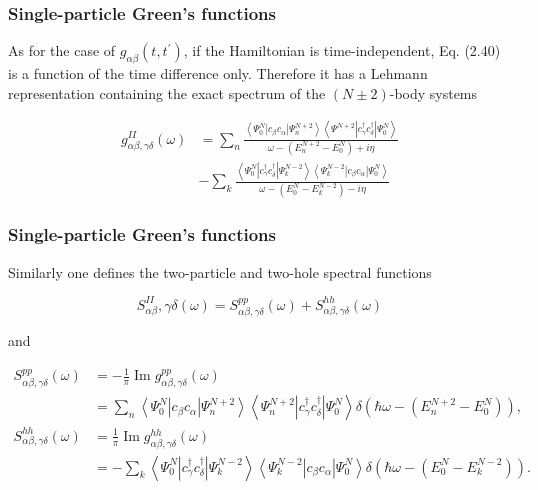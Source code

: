 \documentclass[compress]{beamer}
\begin{document}
\frame
{
\frametitle{Single-particle Green's functions}
\begin{small}
{\scriptsize
As for the case of $g_{\alpha \beta}\left(t, t^{\prime}\right)$, if
the Hamiltonian is time-independent, Eq. (2.40) is a function of the
time difference only. Therefore it has a Lehmann representation
containing the exact spectrum of the $(N \pm 2)$-body systems

$$
\begin{aligned}
g_{\alpha \beta, \gamma \delta}^{I I}(\omega) & =\sum_{n} \frac{\left\langle\Psi_{0}^{N}\left|c_{\beta} c_{\alpha}\right| \Psi_{n}^{N+2}\right\rangle\left\langle\Psi^{N+2}\left|c_{\gamma}^{\dagger} c_{\delta}^{\dagger}\right| \Psi_{0}^{N}\right\rangle}{\omega-\left(E_{n}^{N+2}-E_{0}^{N}\right)+i \eta} \\
& -\sum_{k} \frac{\left\langle\Psi_{0}^{N}\left|c_{\gamma}^{\dagger} c_{\delta}^{\dagger}\right| \Psi_{k}^{N-2}\right\rangle\left\langle\Psi_{k}^{N-2}\left|c_{\beta} c_{\alpha}\right| \Psi_{0}^{N}\right\rangle}{\omega-\left(E_{0}^{N}-E_{k}^{N-2}\right)-i \eta}
\end{aligned}
$$

}
\end{small}
}
\frame
{
\frametitle{Single-particle Green's functions}
\begin{small}
{\scriptsize
Similarly one defines the two-particle and two-hole spectral functions

$$
S_{\alpha \beta}^{I I}, \gamma \delta(\omega)=S_{\alpha \beta, \gamma \delta}^{p p}(\omega)+S_{\alpha \beta, \gamma \delta}^{h h}(\omega)
$$

and

$$
\begin{aligned}
S_{\alpha \beta, \gamma \delta}^{p p}(\omega) & =-\frac{1}{\pi} \operatorname{Im} g_{\alpha \beta, \gamma \delta}^{p p}(\omega) \\
& =\sum_{n}\left\langle\Psi_{0}^{N}\left|c_{\beta} c_{\alpha}\right| \Psi_{n}^{N+2}\right\rangle\left\langle\Psi_{n}^{N+2}\left|c_{\gamma}^{\dagger} c_{\delta}^{\dagger}\right| \Psi_{0}^{N}\right\rangle \delta\left(\hbar \omega-\left(E_{n}^{N+2}-E_{0}^{N}\right)\right), \\
S_{\alpha \beta, \gamma \delta}^{h h}(\omega) & =\frac{1}{\pi} \operatorname{Im} g_{\alpha \beta, \gamma \delta}^{h h}(\omega) \\
& =-\sum_{k}\left\langle\Psi_{0}^{N}\left|c_{\gamma}^{\dagger} c_{\delta}^{\dagger}\right| \Psi_{k}^{N-2}\right\rangle\left\langle\Psi_{k}^{N-2}\left|c_{\beta} c_{\alpha}\right| \Psi_{0}^{N}\right\rangle \delta\left(\hbar \omega-\left(E_{0}^{N}-E_{k}^{N-2}\right)\right) .
\end{aligned}
$$

}
\end{small}
}
\end{document}
